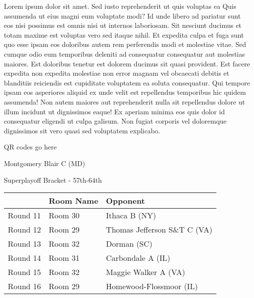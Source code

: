 \documentclass{article}%
\begin{document}
\vspace*{8pt}%
\linebreak%
\newline%
\newline%
    Lorem ipsum dolor sit amet. Sed iusto reprehenderit ut quis voluptas ea Quis assumenda ut eius magni eum voluptate modi? Id unde libero ad pariatur sunt eos nisi possimus est omnis nisi ut internos laboriosam. Sit nesciunt ducimus et totam maxime est voluptas vero sed itaque nihil. Et expedita culpa et fuga sunt quo esse ipsam eos doloribus autem rem perferendis modi et molestiae vitae.\newline%
\newline%
    Sed cumque odio eum temporibus deleniti ad consequatur consequatur aut molestias maiores. Est doloribus tenetur est dolorem ducimus sit quasi provident. Est facere expedita non expedita molestiae non error magnam vel obcaecati debitis et blanditiis reiciendis est cupiditate voluptatem ea soluta consequatur. Qui tempore ipsam eos asperiores aliquid ex unde velit est repellendus temporibus hic quidem assumenda!\newline%
\newline%
    Non autem maiores aut reprehenderit nulla sit repellendus dolore ut illum incidunt ut dignissimos eaque! Ex aperiam minima eos quis dolor id consequatur eligendi ut culpa galisum. Non fugiat corporis vel doloremque dignissimos sit vero quasi sed voluptatem explicabo.\newline%
\newline%
\vspace*{30pt}%
\begin{center}%
\begin{Huge}%
QR codes go here%
\end{Huge}%
\end{center}%
\newpage%
\begin{center}%
\begin{Huge}%
Montgomery Blair C (MD)%
\end{Huge}%
\vspace*{8pt}%
\linebreak%
\begin{Large}%
Superplayoff Bracket {-} 57th{-}64th%
\end{Large}%
\end{center}%
%
\begin{tabularx}{\textwidth}{|c|Y|Y|}%
\hline%
&Room Name&Opponent\\%
\hline%
Round 11&Room 30&Ithaca B (NY)\\%
Round 12&Room 29&Thomas Jefferson S\&T C (VA)\\%
Round 13&Room 32&Dorman (SC)\\%
Round 14&Room 31&Carbondale A (IL)\\%
Round 15&Room 32&Maggie Walker A (VA)\\%
Round 16&Room 29&Homewood{-}Flossmoor (IL)\\%
\hline%
\end{tabularx}%
\end{document}
